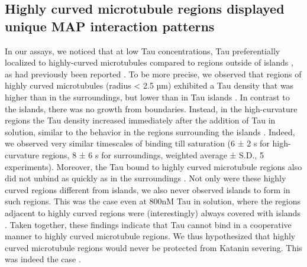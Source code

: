 \subsection{Highly curved microtubule regions displayed unique MAP interaction patterns}
In our assays, we noticed that at low Tau concentrations, Tau preferentially localized to highly-curved microtubules compared to regions outside of islands , as had previously been reported \parencite{Samsonov2004}. To be more precise, we observed that regions of highly curved microtubules (radius < 2.5 µm) exhibited a Tau density that was higher than in the surroundings, but lower than in Tau islands . In contrast to the islands, there was no growth from boundaries. Instead, in the high-curvature regions the Tau density increased immediately after the addition of Tau in solution, similar to the behavior in the regions surrounding the islands . Indeed, we observed very similar timescales of binding till saturation (6 ± 2 s for high-curvature regions, 8 ± 6 s for surroundings, weighted average ± S.D., 5 experiments). Moreover, the Tau bound to highly curved microtubule regions also did not unbind as quickly as in the surroundings . Not only were these highly curved regions different from islands, we also never observed islands to form in such regions. This was the case even at 800nM Tau in solution, where the regions adjacent to highly curved regions were (interestingly) always covered with islands . Taken together, these findings indicate that Tau cannot bind in a cooperative manner to highly curved microtubule regions. We thus hypothesized that highly curved microtubule regions would never be protected from Katanin severing. This was indeed the case .

